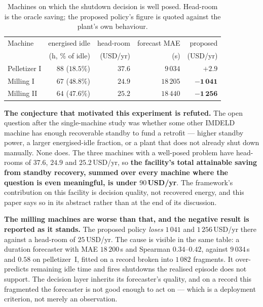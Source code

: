 \begin{table}[t]
\centering
\caption{Machines on which the shutdown decision is well posed.
Head-room is the oracle saving; the proposed policy's figure is quoted
against the plant's own behaviour.}
\label{tab:multimachine:decision}
\small
\setlength{\tabcolsep}{4pt}
\begin{tabular}{@{}lrrrr@{}}
\toprule
Machine & energised idle & head-room & forecast MAE & proposed \\
        & (h, \% of idle) & (USD/yr) & (s) & (USD/yr) \\
\midrule
Pelletizer I & $88$ ($18.5\%$) & $37.6$ & $9\,034$ & $+2.9$ \\
Milling I    & $67$ ($48.8\%$) & $24.9$ & $18\,205$ & $\mathbf{-1\,041}$ \\
Milling II   & $64$ ($47.6\%$) & $25.2$ & $18\,440$ & $\mathbf{-1\,256}$ \\
\bottomrule
\end{tabular}
\end{table}

\textbf{The conjecture that motivated this experiment is refuted.} The
open question after the single-machine study was whether some other
IMDELD machine has enough recoverable standby to fund a retrofit ---
higher standby power, a larger energised-idle fraction, or a plant that
does not already shut down manually. None does. The three machines with
a well-posed problem have head-rooms of $37.6$, $24.9$ and
$25.2$\,USD/yr, so \textbf{the facility's total attainable saving from
standby recovery, summed over every machine where the question is even
meaningful, is under $90$\,USD/yr}. The framework's contribution on this
facility is decision quality, not recovered energy, and this paper says
so in its abstract rather than at the end of its discussion.

\textbf{The milling machines are worse than that, and the negative
result is reported as it stands.} The proposed policy \emph{loses}
$1\,041$ and $1\,256$\,USD/yr there against a head-room of
$25$\,USD/yr. The cause is visible in the same table: a duration
forecaster with MAE $18\,200$\,s and Spearman $0.34$--$0.42$, against
$9\,034$\,s and $0.58$ on pelletizer~I, fitted on a record broken into
$1\,082$ fragments. It over-predicts remaining idle time and fires
shutdowns the realised episode does not support. The decision layer
inherits its forecaster's quality, and on a record this fragmented the
forecaster is not good enough to act on --- which is a deployment
criterion, not merely an observation.
